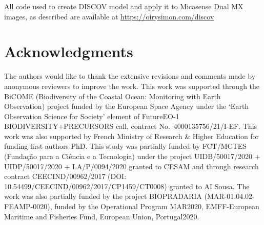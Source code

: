 \documentclass[
  number]{elsarticle}
\begin{document}
All code used to create DISCOV model and apply it to Micasense Dual MX
images, as described are available at
\href{https://oirysimon.com/discov/}{https://oirysimon.com/discov}

\section{Acknowledgments}\label{acknowledgments}

The authors would like to thank the extensive revisions and comments
made by anonymous reviewers to improve the work. This work was supported
through the BiCOME (Biodiversity of the Coastal Ocean: Monitoring with
Earth Observation) project funded by the European Space Agency under the
`Earth Observation Science for Society' element of FutureEO-1
BIODIVERSITY+PRECURSORS call, contract No.~4000135756/21/I-EF. This work
was also supported by French Ministry of Research \& Higher Education
for funding first authors PhD. This study was partially funded by
FCT/MCTES (Fundação para a Ciência e a Tecnologia) under the project
UIDB/50017/2020 + UIDP/50017/2020 + LA/P/0094/2020 granted to CESAM and
through research contract CEECIND/00962/2017 (DOI:
10.54499/CEECIND/00962/2017/CP1459/CT0008) granted to AI Sousa. The work
was also partially funded by the project BIOPRADARIA
(MAR-01.04.02-FEAMP-0020), funded by the Operational Program MAR2020,
EMFF-European Maritime and Fisheries Fund, European Union, Portugal2020.


  
\end{document}
